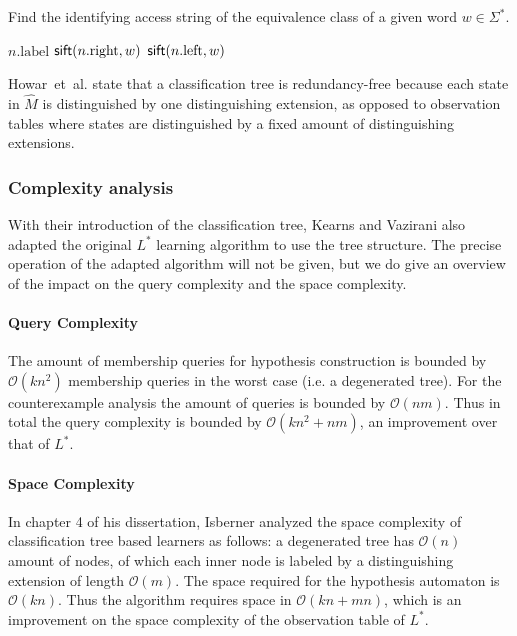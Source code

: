 \documentclass[multi,crop=false,class=article]{standalone}
\begin{document}
\begin{algorithm}[b]
  \caption{Find the identifying access string of the equivalence class of a
    given word $w \in \Sigma^*$.}
  \label{alg:sift}
  \begin{algorithmic}[1]
     
        \State\Return $n.\text{label}$
      \EndIf
        \State $\mathsf{sift}(n.\text{right},w)$
      \Else
        \State $\mathsf{sift}(n.\text{left},w)$
      \EndIf
    \EndFunction{}
  \end{algorithmic}
\end{algorithm}

Howar~et~al. state that a classification tree is redundancy-free because each
state in $\hat M$ is distinguished by one distinguishing extension, as opposed
to observation tables where states are distinguished by a fixed amount of
distinguishing extensions\cite{Howar2014}.

\subsubsection{Complexity analysis}
\label{sec:complexity-analysis}
With their introduction of the classification tree, Kearns and Vazirani also
adapted the original $L^*$ learning algorithm to use the tree
structure\cite{Kearns1994}. The precise operation of the adapted algorithm will
not be given, but we do give an overview of the impact on the query complexity
and the space complexity.

\paragraph{Query Complexity} The amount of membership queries for hypothesis
construction is bounded by $\mathcal{O}(kn^2)$ membership queries in the
worst case (i.e. a degenerated
tree)\cite{Howar2014,Kearns1994,Isberner2014b}. For the counterexample analysis
the amount of queries is bounded by $\mathcal{O}(nm)$\cite{Kearns1994}. Thus in
total the query complexity is bounded by $\mathcal{O}(kn^2 + nm)$, an
improvement over that of $L^*$.

\paragraph{Space Complexity} In chapter 4 of his dissertation, Isberner analyzed
the space complexity of classification tree based learners as follows: a
degenerated tree has $\mathcal{O}(n)$ amount of nodes, of which each inner node
is labeled by a distinguishing extension of length
$\mathcal{O}(m)$\cite{Isberner2015a}.  The space required for the hypothesis
automaton is $\mathcal{O}(kn)$\cite{Isberner2015a}. Thus the algorithm requires
space in $\mathcal{O}(kn + mn)$\cite{Isberner2014b,Isberner2015a}, which is an
improvement on the space complexity of the observation table of $L^*$.
\end{document}
